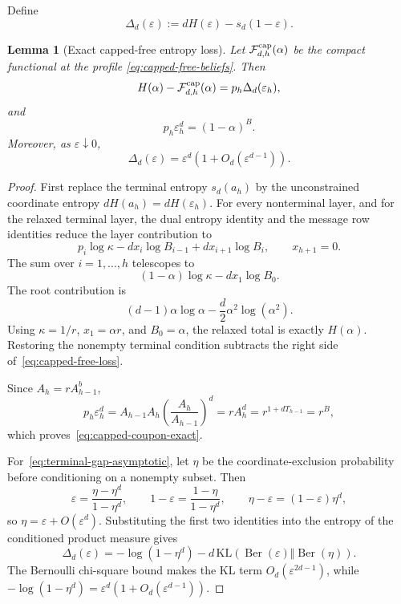 \documentclass[11pt]{amsart}
\newtheorem{lemma}[theorem]{Lemma}
\theoremstyle{definition}
\newcommand{\Fcal}{\mathcal F}
\begin{document}
Define
\[
 \Delta_d(\varepsilon)
 :=dH(\varepsilon)-s_d(1-\varepsilon).
\]

\begin{lemma}[Exact capped-free entropy loss]\label{lem:capped-free-loss}
Let $\Fcal_{d,h}^{\rm cap}(\alpha)$ be the compact functional at the profile
\eqref{eq:capped-free-beliefs}.  Then
\begin{equation}\label{eq:capped-free-loss}
 H(\alpha)-\Fcal_{d,h}^{\rm cap}(\alpha)
 =p_h\Delta_d(\varepsilon_h),
\end{equation}
and
\begin{equation}\label{eq:capped-coupon-exact}
 p_h\varepsilon_h^d=(1-\alpha)^B.
\end{equation}
Moreover, as $\varepsilon\downarrow0$,
\begin{equation}\label{eq:terminal-gap-asymptotic}
 \Delta_d(\varepsilon)
 =\varepsilon^d\left(1+O_d(\varepsilon^{d-1})\right).
\end{equation}
\end{lemma}

\begin{proof}
First replace the terminal entropy $s_d(a_h)$ by the unconstrained coordinate entropy $dH(a_h)=dH(\varepsilon_h)$.  For every nonterminal layer, and for the relaxed terminal layer, the dual entropy identity and the message row identities reduce the layer contribution to
\[
 p_i\log\kappa
 -d x_i\log B_{i-1}
 +d x_{i+1}\log B_i,
 \qquad x_{h+1}=0.
\]
The sum over $i=1,\ldots,h$ telescopes to
\[
 (1-\alpha)\log\kappa-dx_1\log B_0.
\]
The root contribution is
\[
 (d-1)\alpha\log\alpha
 -\frac d2\alpha^2\log(\alpha^2).
\]
Using $\kappa=1/r$, $x_1=\alpha r$, and $B_0=\alpha$, the relaxed total is exactly $H(\alpha)$.  Restoring the nonempty terminal condition subtracts the right side of~\eqref{eq:capped-free-loss}.

Since $A_h=rA_{h-1}^b$,
\[
 p_h\varepsilon_h^d
 =A_{h-1}A_h\left(\frac{A_h}{A_{h-1}}\right)^d
 =rA_h^d
 =r^{1+dT_{h-1}}
 =r^B,
\]
which proves~\eqref{eq:capped-coupon-exact}.

For~\eqref{eq:terminal-gap-asymptotic}, let $\eta$ be the coordinate-exclusion probability before conditioning on a nonempty subset.  Then
\[
 \varepsilon=\frac{\eta-\eta^d}{1-\eta^d},
 \qquad
 1-\varepsilon=\frac{1-\eta}{1-\eta^d},
 \qquad
 \eta-\varepsilon=(1-\varepsilon)\eta^d,
\]
so $\eta=\varepsilon+O(\varepsilon^d)$.  Substituting the first two identities into the entropy of the conditioned product measure gives
\[
 \Delta_d(\varepsilon)
 =-\log(1-\eta^d)
 -d\,\mathrm{KL}\!\left(
 \operatorname{Ber}(\varepsilon)
 \Vert\operatorname{Ber}(\eta)
 \right).
\]
The Bernoulli chi-square bound makes the KL term
$O_d(\varepsilon^{2d-1})$, while
$-\log(1-\eta^d)=\varepsilon^d(1+O_d(\varepsilon^{d-1}))$.
\end{proof}
\end{document}
